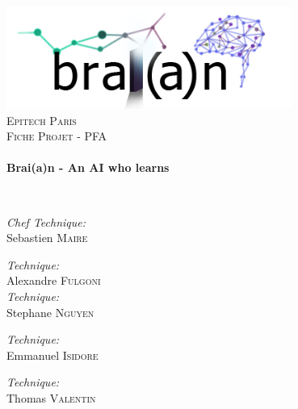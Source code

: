 \begin{titlepage}
  \begin{center}

    \includegraphics[width=0.7\textwidth]{braian}~\\[1cm]

    \textsc{\LARGE Epitech Paris}\\[1.5cm]

    \textsc{\Large Fiche Projet - PFA}\\[0.5cm]

    \HRule \\[0.4cm]
    { \huge \bfseries Brai(a)n - An AI who learns \\[0.4cm] }

    \HRule \\[1.5cm]

    \noindent

    \begin{multicols}{3}
      \emph{Chef Technique:}\\
      Sebastien \textsc{Maire} \\

      \vspace{1cm}

      \emph{Technique:} \\
      Alexandre \textsc{Fulgoni} \\

      \emph{Technique:} \\
      Stephane \textsc{Nguyen} \\

      \vspace{1cm}


      \emph{Technique:} \\
      Emmanuel \textsc{Isidore} \\

      \vspace{1cm}

      \emph{Technique:} \\
      Thomas \textsc{Valentin} \\
   \end{multicols}


\end{center}
\end{titlepage}
